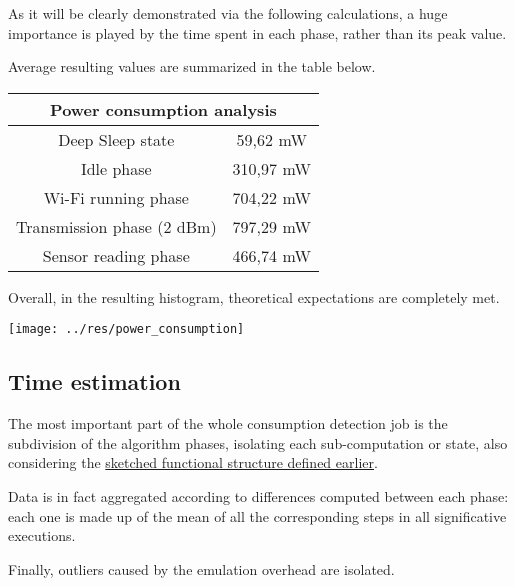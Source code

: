 \documentclass[a4paper,11pt]{article} %
\begin{document}
    As it will be clearly demonstrated via the following calculations, a huge importance is played by the time spent in each phase, rather than its peak value.

    Average resulting values are summarized in the table below.

    \smallskip

    \begin{center}
        \begin{tabular}{|c|c|}
            \hline
            \multicolumn{2}{|c|}{Power consumption analysis} \\
            \hline
            Deep Sleep state           & 59,62 mW  \\
            \hline
            Idle phase                 & 310,97 mW \\
            \hline
            Wi-Fi running phase        & 704,22 mW \\
            \hline
            Transmission phase (2 dBm) & 797,29 mW \\
            \hline
            Sensor reading phase       & 466,74 mW \\
            \hline
        \end{tabular}
    \end{center}

    \smallskip

    Overall, in the resulting histogram, theoretical expectations are completely met.

    \medskip

    \begin{center}
        \texttt{[image: ../res/power\_consumption]}
    \end{center}

    \subsection{Time estimation}\label{subsec:time-estimation}
    The most important part of the whole consumption detection job is the subdivision of the algorithm phases, isolating each sub-computation or state, also considering the \hyperref[sec:implementation-and-design-choices]{sketched functional structure defined earlier}.

    Data is in fact aggregated according to differences computed between each phase: each one is made up of the mean of all the corresponding steps in all significative executions.

    Finally, outliers caused by the emulation overhead are isolated.
\end{document}
